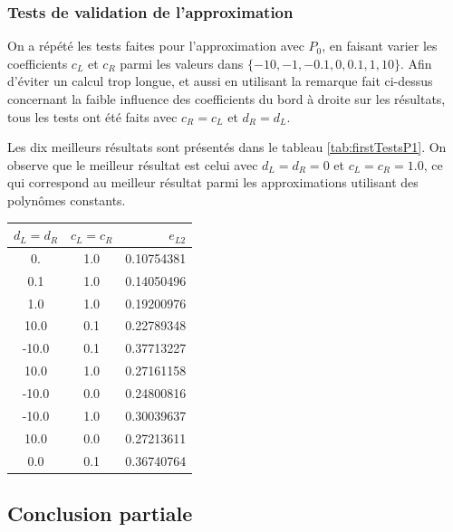 \endgroup

\subsubsection{Tests de validation de l'approximation}

\indent On a répété les tests faites pour l'approximation avec $P_0$, en faisant varier les coefficients $c_L$ et $c_R$ parmi les valeurs dans $\{-10,-1,-0.1,0,0.1,1,10\}$. Afin d'éviter un calcul trop longue, et aussi en utilisant la remarque fait ci-dessus concernant la faible influence des coefficients du bord à droite sur les résultats, tous les tests ont été faits avec $c_R = c_L$ et $d_R = d_L$.

\indent Les dix meilleurs résultats sont présentés dans le tableau \ref{tab:firstTestsP1}. On observe que le meilleur résultat est celui avec $d_L = d_R = 0$ et $c_L = c_R = 1.0 $, ce qui correspond au meilleur résultat parmi les approximations utilisant des polynômes constants.


\begin{center}
\begin{tabular}{c|c|S[round-precision=4,table-number-alignment =  left]}
	  &  &  \\
	. & 1.0 & 0.10754381 \\
	0.1 & 1.0 & 0.14050496 \\
	1.0 & 1.0 & 0.19200976 \\
	10.0 & 0.1 & 0.22789348 \\
	-10.0 & 0.1 & 0.37713227 \\
	10.0 & 1.0 & 0.27161158 \\
	-10.0 &  0.0 & 0.24800816\\
	-10.0 & 1.0 & 0.30039637 \\
	10.0 & 0.0 & 0.27213611 \\
	0.0 & 0.1 & 0.36740764
\end{tabular}
\end{center}

\subsection{Conclusion partiale}

